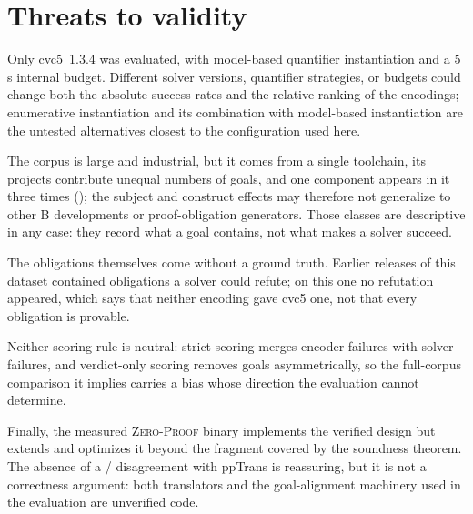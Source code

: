\section{Threats to validity}
\label{sec:threats-to-validity}

Only cvc5~1.3.4 was evaluated, with model-based quantifier instantiation and a \(5\)\,s internal budget.
Different solver versions, quantifier strategies, or budgets could change both the absolute success rates and the relative ranking of the encodings; enumerative instantiation and its combination with model-based instantiation are the untested alternatives closest to the configuration used here.

The corpus is large and industrial, but it comes from a single toolchain, its projects contribute unequal numbers of goals, and one component appears in it three times (); the subject and construct effects may therefore not generalize to other B developments or proof-obligation generators.
Those classes are descriptive in any case: they record what a goal contains, not what makes a solver succeed.

The obligations themselves come without a ground truth.
Earlier releases of this dataset contained obligations a solver could refute; on this one no refutation appeared, which says that neither encoding gave cvc5 one, not that every obligation is provable.

Neither scoring rule is neutral: strict scoring merges encoder failures with solver failures, and verdict-only scoring removes \bmDropped{} goals asymmetrically, so the full-corpus comparison it implies carries a bias whose direction the evaluation cannot determine.

Finally, the measured \textsc{Zero-Proof} \beer{} binary implements the verified design but extends and optimizes it beyond the fragment covered by the soundness theorem.
The absence of a / disagreement with ppTrans is reassuring, but it is not a correctness argument: both translators and the goal-alignment machinery used in the evaluation are unverified code.
